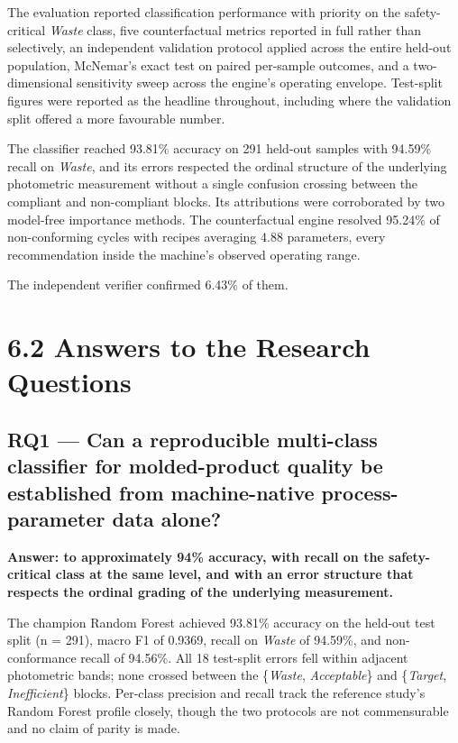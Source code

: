 The evaluation reported classification performance with priority on the safety-critical \emph{Waste} class, five counterfactual metrics reported in full rather than selectively, an independent validation protocol applied across the entire held-out population, McNemar's exact test on paired per-sample outcomes, and a two-dimensional sensitivity sweep across the engine's operating envelope. Test-split figures were reported as the headline throughout, including where the validation split offered a more favourable number.

The classifier reached 93.81\% accuracy on 291 held-out samples with 94.59\% recall on \emph{Waste}, and its errors respected the ordinal structure of the underlying photometric measurement without a single confusion crossing between the compliant and non-compliant blocks. Its attributions were corroborated by two model-free importance methods. The counterfactual engine resolved 95.24\% of non-conforming cycles with recipes averaging 4.88 parameters, every recommendation inside the machine's observed operating range.

The independent verifier confirmed 6.43\% of them.

\hypertarget{answers-to-the-research-questions}{%
\section{6.2 Answers to the Research Questions}\label{answers-to-the-research-questions}}

\hypertarget{rq1-can-a-reproducible-multi-class-classifier-for-molded-product-quality-be-established-from-machine-native-process-parameter-data-alone}{%
\subsection{RQ1 --- Can a reproducible multi-class classifier for molded-product quality be established from machine-native process-parameter data alone?}\label{rq1-can-a-reproducible-multi-class-classifier-for-molded-product-quality-be-established-from-machine-native-process-parameter-data-alone}}

\textbf{Answer: to approximately 94\% accuracy, with recall on the safety-critical class at the same level, and with an error structure that respects the ordinal grading of the underlying measurement.}

The champion Random Forest achieved 93.81\% accuracy on the held-out test split (n = 291), macro F1 of 0.9369, recall on \emph{Waste} of 94.59\%, and non-conformance recall of 94.56\%. All 18 test-split errors fell within adjacent photometric bands; none crossed between the \{\emph{Waste}, \emph{Acceptable}\} and \{\emph{Target}, \emph{Inefficient}\} blocks. Per-class precision and recall track the reference study's Random Forest profile closely, though the two protocols are not commensurable and no claim of parity is made.

